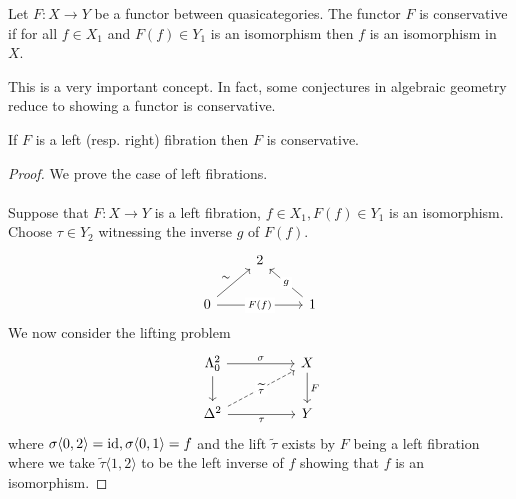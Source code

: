 \begin{definition}\label{def: conservative functor}
    Let $F:X\to Y$ be a functor between quasicategories. The functor $F$ is conservative if for all $f\in X_{1}$ and $F(f)\in Y_{1}$ is an isomorphism then $f$ is an isomorphism in $X$. 
\end{definition}
\begin{remark}
    This is a very important concept. In fact, some conjectures in algebraic geometry reduce to showing a functor is conservative. 
\end{remark}
\begin{proposition}
    If $F$ is a left (resp. right) fibration then $F$ is conservative. 
\end{proposition}
\begin{proof}
    We prove the case of left fibrations. 
    \\\\
    Suppose that $F:X\to Y$ is a left fibration, $f\in X_{1}, F(f)\in Y_{1}$ is an isomorphism. Choose $\tau\in Y_{2}$ witnessing the inverse $g$ of $F(f)$. 
    $$%
    \begin{tikzcd}
        & 2 \\
        0 && 1
        \arrow["{F(f)}"{description}, from=2-1, to=2-3]
        \arrow["g"{description}, from=2-3, to=1-2]
        \arrow["\sim", from=2-1, to=1-2]
    \end{tikzcd}$$
    We now consider the lifting problem 
    $$%
    \begin{tikzcd}
        {\Lambda^{2}_{0}} && X \\
        {\Delta^{2}} && Y
        \arrow[from=1-1, to=2-1]
        \arrow["F", from=1-3, to=2-3]
        \arrow["\sigma", from=1-1, to=1-3]
        \arrow["\tau"', from=2-1, to=2-3]
        \arrow["{\widetilde{\tau}}"{description}, dashed, from=2-1, to=1-3]
    \end{tikzcd}$$
    where $\sigma\langle0,2\rangle=\mathrm{id}, \sigma\langle0,1\rangle=f$ and the lift $\widetilde{\tau}$ exists by $F$ being a left fibration where we take $\widetilde{\tau}\langle1,2\rangle$ to be the left inverse of $f$ showing that $f$ is an isomorphism. 
\end{proof}
